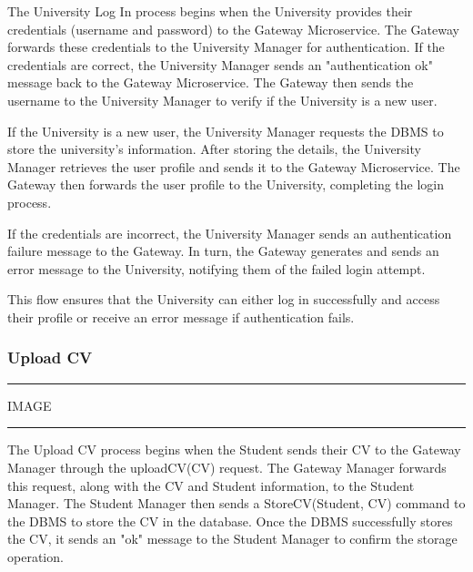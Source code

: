The University Log In process begins when the University provides their credentials (username and password) to the Gateway Microservice. The Gateway forwards these credentials to the University Manager for authentication. If the credentials are correct, the University Manager sends an "authentication ok" message back to the Gateway Microservice. The Gateway then sends the username to the University Manager to verify if the University is a new user.

If the University is a new user, the University Manager requests the DBMS to store the university’s information. After storing the details, the University Manager retrieves the user profile and sends it to the Gateway Microservice. The Gateway then forwards the user profile to the University, completing the login process.

If the credentials are incorrect, the University Manager sends an authentication failure message to the Gateway. In turn, the Gateway generates and sends an error message to the University, notifying them of the failed login attempt.

This flow ensures that the University can either log in successfully and access their profile or receive an error message if authentication fails.

\subsubsection{Upload CV}

\vspace{20pt}
\hrule
\vspace{10pt}
IMAGE
\vspace{10pt}
\hrule
\vspace{20pt}

The Upload CV process begins when the Student sends their CV to the Gateway Manager through the uploadCV(CV) request. The Gateway Manager forwards this request, along with the CV and Student information, to the Student Manager. The Student Manager then sends a StoreCV(Student, CV) command to the DBMS to store the CV in the database. Once the DBMS successfully stores the CV, it sends an "ok" message to the Student Manager to confirm the storage operation.

